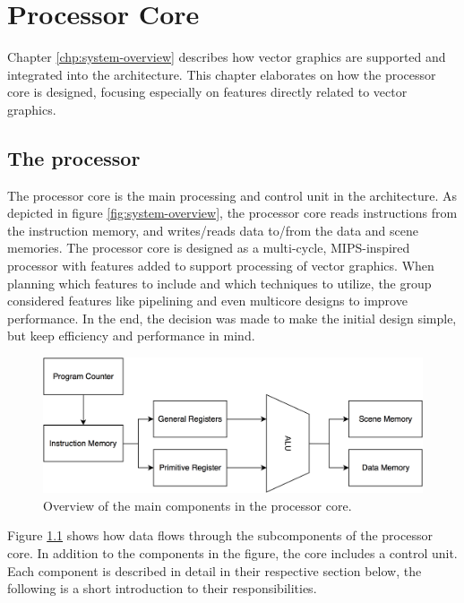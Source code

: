 \chapter{Processor Core}

Chapter \ref{chp:system-overview} describes how vector graphics are supported and integrated into the \vthreek architecture.
This chapter elaborates on how the processor core is designed, focusing especially on features directly related to vector graphics.

\section{The \vthreek processor}

The processor core is the main processing and control unit in the \vthreek architecture.
As depicted in figure \ref{fig:system-overview}, the processor core reads instructions from the instruction memory, and writes/reads data to/from the data and scene memories.
The processor core is designed as a multi-cycle, MIPS-inspired processor with features added to support processing of vector graphics.
When planning which features to include and which techniques to utilize, the group considered features like pipelining and even multicore designs to improve performance.
In the end, the decision was made to make the initial design simple, but keep efficiency and performance in mind.

\begin{figure}[H]
    \includegraphics[width=\linewidth]{images/core-components.png}
    \caption{Overview of the main components in the processor core.}
    \label{fig:core-components}
\end{figure}

Figure \ref{fig:core-components} shows how data flows through the subcomponents of the processor core.
In addition to the components in the figure, the core includes a control unit.
Each component is described in detail in their respective section below, the following is a short introduction to their responsibilities.

